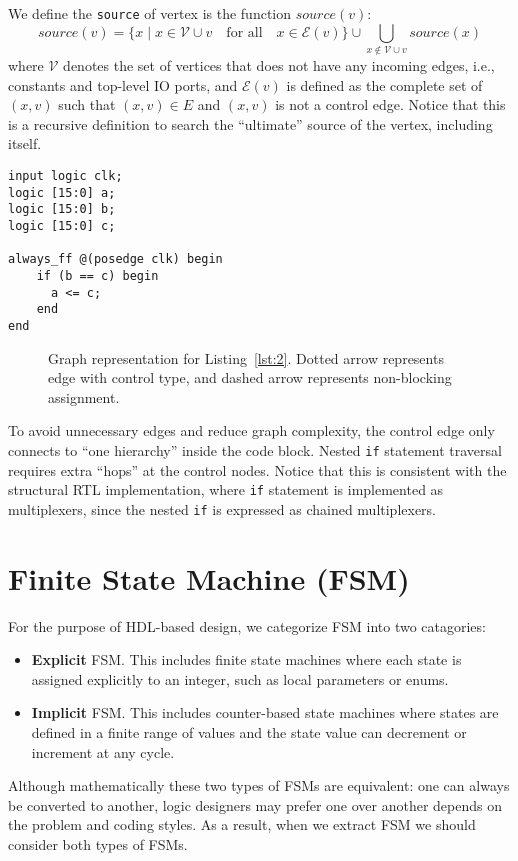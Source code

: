 \documentclass{article}
\begin{document}
We define the \texttt{source} of vertex is the function $source(v)$:
\[
    source(v) = \{x \mid x \in \mathcal{V} \cup {v}\quad\text{for all}\quad x \in \mathcal{E}(v) \} \cup \bigcup_{x \not \in \mathcal{V} \cup {v}}
                source(x)
\]
where $\mathcal{V}$ denotes the set of vertices that does not have any incoming edges,
i.e., constants and top-level IO ports, and $\mathcal{E}(v)$ is defined as the complete
set of $(x, v)$ such that $(x, v) \in E$ and $(x, v)$ is not a control edge.
Notice that this is a recursive definition to search the ``ultimate'' source of the
vertex, including itself.

\begin{lstlisting}[style={verilog-style}, caption={Control vertex and non-blocking
    assignment Verilog code},
    label={lst:2}]
input logic clk;
logic [15:0] a;
logic [15:0] b;
logic [15:0] c;

always_ff @(posedge clk) begin
    if (b == c) begin
      a <= c;
    end
end
\end{lstlisting}

\begin{figure}
    \centering
    \begin{tikzpicture}
    
    \end{tikzpicture}
    \caption{Graph representation for Listing~\ref{lst:2}. Dotted arrow represents edge with control
    type, and dashed arrow represents non-blocking assignment.}
    \label{fig:2}
\end{figure}

To avoid unnecessary edges and reduce graph complexity, the control edge only connects to ``one hierarchy''
inside the code block. Nested \texttt{if} statement traversal requires extra ``hops'' at the control nodes.
Notice that this is consistent with the structural RTL implementation, where \texttt{if} statement is
implemented as multiplexers, since the nested \texttt{if} is expressed as chained multiplexers. 

\section{Finite State Machine (FSM)}\label{sec:fsm}
For the purpose of HDL-based design, we categorize FSM into two catagories:
\begin{itemize}
    \item \textbf{Explicit} FSM. This includes finite state machines where each state
    is assigned explicitly to an integer, such as local parameters or enums.
    \item \textbf{Implicit} FSM. This includes counter-based state machines where
    states are defined in a finite range of values and the state value can decrement
    or increment at any cycle.
\end{itemize}
Although mathematically these two types of FSMs are equivalent: one can always be
converted to another, logic designers may prefer one over another depends on the
problem and coding styles. As a result, when we extract FSM we should consider both
types of FSMs.
\end{document}
